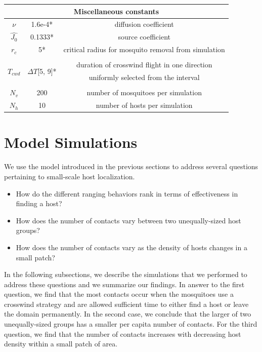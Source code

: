 \documentclass[12pt]{article}
\begin{document}
\begin{table}[hbtp]
\begin{center}
\begin{tabular}{|c|c|c|}
			\hline
			\multicolumn{3}{|c|}{Miscellaneous constants} \\
			\hline
			$\nu$ & 1.6e-4* & diffusion coefficient\\
			$\hat{J_0}$ & 0.1333* & source coefficient\\
			$r_c$ & 5* & critical radius for mosquito removal from simulation \\
			\multirow{4}{*}{$T_{cwd}$} & \multirow{4}{*}{$\Delta T$[5, 9]*} & \\
			& & duration of crosswind flight in one direction \\
			& & uniformly selected from the interval \\
			&&\\
			$N_v$ & 200 & number of mosquitoes per simulation \\
			$N_h$ & 10 & number of hosts per simulation \\
			\hline
		\end{tabular}
	\end{center}\label{tab:finalparams}
\end{table}








\section{Model Simulations}
 We use the model introduced in the previous sections to address several questions pertaining to small-scale host localization.
	\begin{itemize}
		\item How do the different ranging behaviors rank in terms of effectiveness in finding a host?
		\item How does the number of contacts vary between two unequally-sized host groups?
		\item How does the number of contacts vary as the density of hosts changes in a small patch?
	\end{itemize}
In the following subsections, we describe the simulations that we performed to address these questions and we summarize our findings. In answer to the first question, we find that the most contacts occur when the mosquitoes use a crosswind strategy and are allowed sufficient time to either find a host or leave the domain permanently. In the second case, we conclude that the larger of two unequally-sized groups has a smaller per capita number of contacts. For the third question, we find that the number of contacts increases with decreasing host density within a small patch of area.
	
\end{document}
